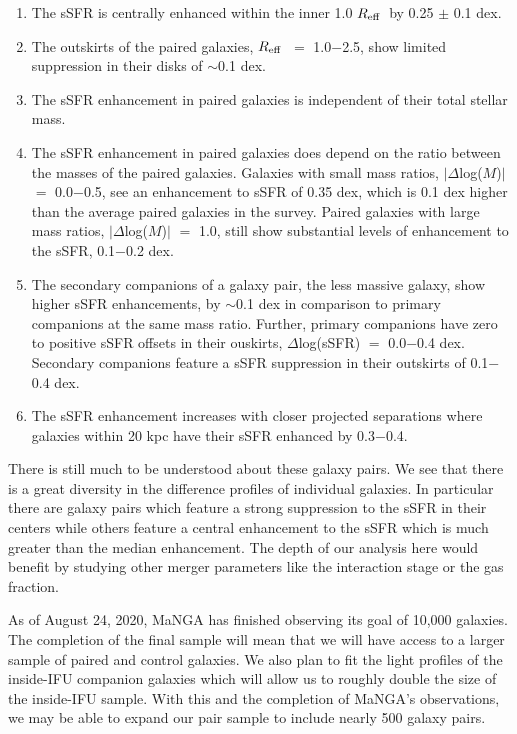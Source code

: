 \documentclass[iop,revtex4,twocolumn,apj,numberedappendix,appendixfloats]{emulateapj}
\newcommand{\reff}{$R_{\rm eff}$}
\begin{document}
\begin{enumerate}
\item The sSFR is centrally enhanced within the inner 1.0 \reff\ by 0.25 $\pm$ 0.1 dex. 
\item The outskirts of the paired galaxies, \reff\ $=$ 1.0$-$2.5, show limited suppression in their disks of $\sim$0.1 dex.
\item The sSFR enhancement in paired galaxies is independent of their total stellar mass.
\item The sSFR enhancement in paired galaxies does depend on the ratio between the masses of the paired galaxies. Galaxies with small mass ratios, $|\Delta$log($M$)$|$ $=$ 0.0$-$0.5, see an enhancement to sSFR of 0.35 dex, which is 0.1 dex higher than the average paired galaxies in the survey. Paired galaxies with large mass ratios, $|\Delta$log($M$)$|$ $=$ 1.0, still show substantial levels of enhancement to the sSFR, 0.1$-$0.2 dex. 
\item The secondary companions of a galaxy pair, the less massive galaxy, show higher sSFR enhancements, by $\sim$0.1 dex in comparison to primary companions at the same mass ratio. Further, primary companions have zero to positive sSFR offsets in their ouskirts, $\Delta$log(sSFR) $=$ 0.0$-$0.4 dex. Secondary companions feature a sSFR suppression in their outskirts of 0.1$-$0.4 dex.
\item The sSFR enhancement increases with closer projected separations where galaxies within 20 kpc have their sSFR enhanced by 0.3$-$0.4. 
\end{enumerate}

There is still much to be understood about these galaxy pairs. We see that there is a great diversity in the difference profiles of individual galaxies. In particular there are galaxy pairs which feature a strong suppression to the sSFR in their centers while others feature a central enhancement to the sSFR which is much greater than the median enhancement. The depth of our analysis here would benefit by studying other merger parameters like the interaction stage or the gas fraction. 

As of August 24, 2020, MaNGA has finished observing its goal of 10,000 galaxies. The completion of the final sample will mean that we will have access to a larger sample of paired and control galaxies. We also plan to fit the light profiles of the inside-IFU companion galaxies which will allow us to roughly double the size of the inside-IFU sample. With this and the completion of MaNGA's observations, we may be able to expand our pair sample to include nearly 500 galaxy pairs.
\end{document}
